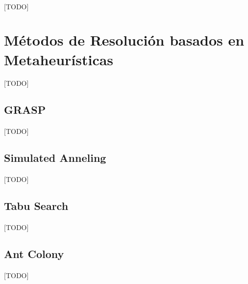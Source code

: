 \documentclass{subfiles}
\begin{document}
      \paragraph{}
      [TODO]

    \section{Métodos de Resolución basados en Metaheurísticas}
    \label{sec:solving_metaheuristics}

      \paragraph{}
      [TODO]

      \subsection{GRASP}
      \label{sec:solving_grasp}

        \paragraph{}
        [TODO]

      \subsection{Simulated Anneling}
      \label{sec:solving_simulated_anneling}

        \paragraph{}
        [TODO]

      \subsection{Tabu Search}
      \label{sec:solving_tabu}

        \paragraph{}
        [TODO]

      \subsection{Ant Colony}
      \label{sec:solving_ant_colony}

        \paragraph{}
        [TODO]
\end{document}
